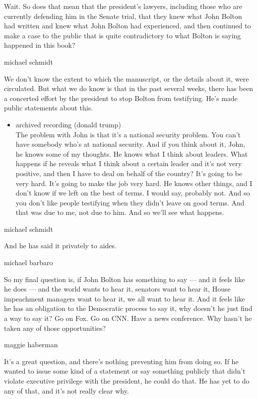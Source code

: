 Wait. So does that mean that the president's lawyers, including those
who are currently defending him in the Senate trial, that they knew what
John Bolton had written and knew what John Bolton had experienced, and
then continued to make a case to the public that is quite contradictory
to what Bolton is saying happened in this book?

michael schmidt

We don't know the extent to which the manuscript, or the details about
it, were circulated. But what we do know is that in the past several
weeks, there has been a concerted effort by the president to stop Bolton
from testifying. He's made public statements about this.

\begin{itemize}
\tightlist
\item
  archived recording (donald trump)\\
  The problem with John is that it's a national security problem. You
  can't have somebody who's at national security. And if you think about
  it, John, he knows some of my thoughts. He knows what I think about
  leaders. What happens if he reveals what I think about a certain
  leader and it's not very positive, and then I have to deal on behalf
  of the country? It's going to be very hard. It's going to make the job
  very hard. He knows other things, and I don't know if we left on the
  best of terms. I would say, probably not. And so you don't like people
  testifying when they didn't leave on good terms. And that was due to
  me, not due to him. And so we'll see what happens.
\end{itemize}

michael schmidt

And he has said it privately to aides.

michael barbaro

So my final question is, if John Bolton has something to say --- and it
feels like he does --- and the world wants to hear it, senators want to
hear it, House impeachment managers want to hear it, we all want to hear
it. And it feels like he has an obligation to the Democratic process to
say it, why doesn't he just find a way to say it? Go on Fox. Go on CNN.
Have a news conference. Why hasn't he taken any of those opportunities?

maggie haberman

It's a great question, and there's nothing preventing him from doing so.
If he wanted to issue some kind of a statement or say something publicly
that didn't violate executive privilege with the president, he could do
that. He has yet to do any of that, and it's not really clear why.

